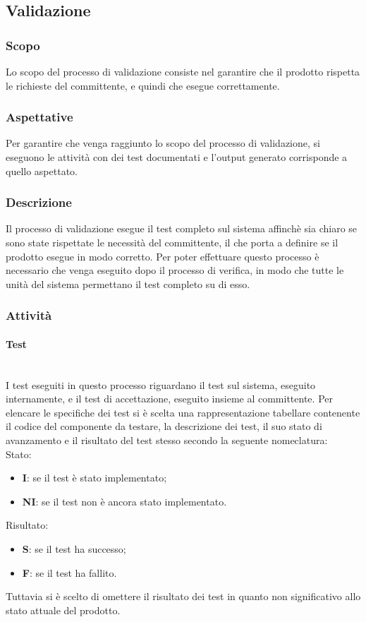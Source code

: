 \subsection{Validazione}

	\subsubsection{Scopo}
		Lo scopo del processo di validazione consiste nel garantire che il prodotto rispetta le richieste del committente, e quindi che esegue correttamente.
	\subsubsection{Aspettative}
		Per garantire che venga raggiunto lo scopo del processo di validazione, si eseguono le attività con dei test documentati e l'output generato corrisponde a quello aspettato.
	\subsubsection{Descrizione}
		Il processo di validazione esegue il test completo sul sistema affinchè sia chiaro se sono state rispettate le necessità del committente, il che porta a definire se il prodotto esegue in modo corretto. Per poter effettuare questo processo è necessario che venga eseguito dopo il processo di verifica, in modo che tutte le unità del sistema permettano il test completo su di esso. 
	\subsubsection{Attività}
		\paragraph{Test}\mbox{}\\
			I test eseguiti in questo processo riguardano il test sul sistema, eseguito internamente, e il test di accettazione, eseguito insieme al committente.
			Per elencare le specifiche dei test si è scelta una rappresentazione tabellare contenente il codice del componente da testare, la descrizione dei test, il suo stato di avanzamento e il risultato del test stesso secondo la seguente nomeclatura: \\
                Stato:
                \begin{itemize}
                    \item \textbf{I}: se il test è stato implementato;
                    \item \textbf{NI}: se il test non è ancora stato implementato.     
                \end{itemize}
                Risultato:
                \begin{itemize}
                    \item \textbf{S}: se il test ha successo;
                    \item \textbf{F}: se il test ha fallito.
                \end{itemize}
                Tuttavia si è scelto di omettere il risultato dei test in quanto non significativo allo stato attuale del prodotto.

